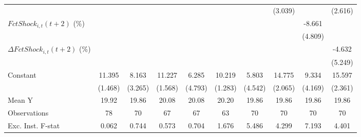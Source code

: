 {\begin{tabular}{l*{9}{c}}
                    &                     &                     &                     &                     &                     &                     &     (3.039)         &                     &     (2.616)         \\
\addlinespace
$ FctShock_{i,t}(t+2)$ (\%)&                     &                     &                     &                     &                     &                     &                     &      -8.661         &                     \\
                    &                     &                     &                     &                     &                     &                     &                     &     (4.809)         &                     \\
\addlinespace
$ \Delta FctShock_{i,t}(t+2)$ (\%)&                     &                     &                     &                     &                     &                     &                     &                     &      -4.632         \\
                    &                     &                     &                     &                     &                     &                     &                     &                     &     (5.249)         \\
\addlinespace
Constant            &      11.395\sym{***}&       8.163\sym{**} &      11.227\sym{***}&       6.285         &      10.219\sym{***}&       5.803         &      14.775\sym{***}&       9.334\sym{**} &      15.597\sym{***}\\
                    &     (1.468)         &     (3.265)         &     (1.568)         &     (4.793)         &     (1.283)         &     (4.542)         &     (2.065)         &     (4.169)         &     (2.361)         \\
\midrule
Mean Y              &       19.92         &       19.86         &       20.08         &       20.08         &       20.20         &       19.86         &       19.86         &       19.86         &       19.86         \\
Observations        &          78         &          70         &          67         &          67         &          63         &          70         &          70         &          70         &          70         \\
Exc. Inst. F-stat   &       0.062         &       0.744         &       0.573         &       0.704         &       1.676         &       5.486         &       4.299         &       7.193         &       4.401         \\
\bottomrule
\end{tabular}
}
